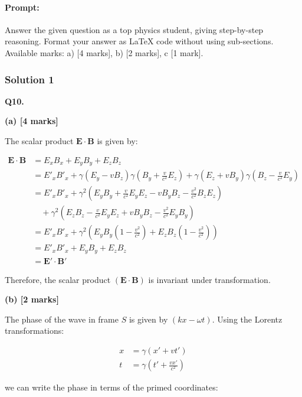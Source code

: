 \documentclass{article}
\begin{document}
\paragraph{Prompt: \\} 
Answer the given question as a top physics student, giving step-by-step reasoning. Format your answer as LaTeX code without using sub-sections. Available marks: a) [4 marks], b) [2 marks], c [1 mark].

\subsubsection{Solution 1}
\textbf{Q10.}

\textbf{(a) [4 marks]}

The scalar product $\mathbf{E} \cdot \mathbf{B}$ is given by:

\begin{align*}
\mathbf{E} \cdot \mathbf{B} &= E_x B_x + E_y B_y + E_z B_z \\
&= E'_x B'_x + \gamma (E_y - v B_z) \gamma \left( B_y + \frac{v}{c^2} E_z \right) + \gamma (E_z + v B_y) \gamma \left( B_z - \frac{v}{c^2} E_y \right) \\
&= E'_x B'_x + \gamma^2 \left( E_y B_y + \frac{v}{c^2} E_y E_z - v B_y B_z - \frac{v^2}{c^2} B_z E_z \right) \\
&\quad + \gamma^2 \left( E_z B_z - \frac{v}{c^2} E_y E_z + v B_y B_z - \frac{v^2}{c^2} E_y B_y \right) \\
&= E'_x B'_x + \gamma^2 \left( E_y B_y \left( 1 - \frac{v^2}{c^2} \right) + E_z B_z \left( 1 - \frac{v^2}{c^2} \right) \right) \\
&= E'_x B'_x + E_y B_y + E_z B_z \\
&= \mathbf{E'} \cdot \mathbf{B'}
\end{align*}

Therefore, the scalar product $(\mathbf{E} \cdot \mathbf{B})$ is invariant under transformation.


\textbf{(b) [2 marks]}

The phase of the wave in frame $S$ is given by $(kx - \omega t)$.  Using the Lorentz transformations:

\begin{align*}
x &= \gamma (x' + vt') \\
t &= \gamma \left( t' + \frac{vx'}{c^2} \right)
\end{align*}

we can write the phase in terms of the primed coordinates:
\end{document}
